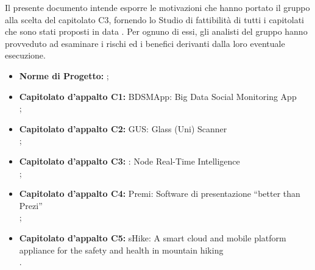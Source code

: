 
		Il presente documento intende esporre le motivazioni che hanno portato il gruppo alla scelta del capitolato C3, fornendo lo Studio di fattibilità di tutti i capitolati che sono stati proposti in data . Per ognuno di essi, gli analisti del gruppo hanno provveduto ad esaminare i rischi ed i benefici derivanti dalla loro eventuale esecuzione.
	
	



			\begin{itemize}
				\item \textbf{Norme di Progetto:} ;
				\item \textbf{Capitolato d'appalto C1:} BDSMApp: Big Data Social Monitoring App\\
					;
				\item \textbf{Capitolato d'appalto C2:} GUS: Glass (Uni) Scanner\\
					;
				\item \textbf{Capitolato d'appalto C3:} \projectname: Node Real-Time Intelligence\\
					;
				\item \textbf{Capitolato d'appalto C4:} Premi: Software di presentazione “better than Prezi”\\
					;
				\item \textbf{Capitolato d'appalto C5:} sHike: A smart cloud and mobile platform appliance for the safety and health in mountain hiking\\
					.
			\end{itemize}

